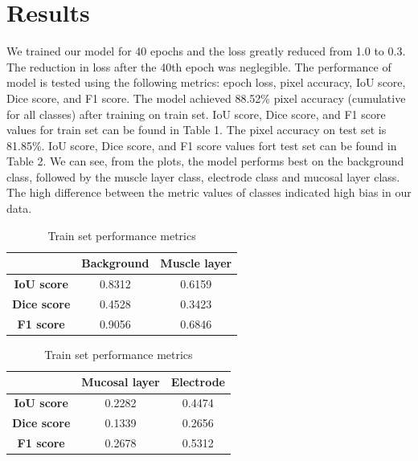 \section{Results}
\label{sec:results}

We trained our model for 40 epochs and the loss greatly reduced from 1.0 to 0.3. The reduction in loss after the 40th epoch was neglegible. The performance of model is tested using the following metrics: epoch loss, pixel accuracy, IoU score, Dice score, and F1 score. The model achieved 88.52\% pixel accuracy (cumulative for all classes) after training on train set. IoU score, Dice score, and F1 score values for train set can be found in Table 1. The pixel accuracy on test set is 81.85\%. IoU score, Dice score, and F1 score values fort test set can be found in Table 2. We can see, from the plots, the model performs best on the background class, followed by the muscle layer class, electrode class and mucosal layer class. The high difference between the metric values of classes indicated high bias in our data.

\begin{table}[htbp]
    \centering
    \caption{Train set performance metrics}
    \label{tab:train-metrics}

    \begin{tabular}{|c|c|c|}
        \hline
        & \textbf{Background} & \textbf{Muscle layer} \\
        \hline
        \textbf{IoU score} & 0.8312 & 0.6159 \\
        \textbf{Dice score} & 0.4528 & 0.3423 \\
        \textbf{F1 score} & 0.9056 & 0.6846 \\
        \hline
    \end{tabular}

    \begin{tabular}{|c|c|c|}
        \hline
        & \textbf{Mucosal layer} & \textbf{Electrode} \\
        \hline
        \textbf{IoU score} & 0.2282 & 0.4474 \\
        \textbf{Dice score} & 0.1339 & 0.2656 \\
        \textbf{F1 score} & 0.2678 & 0.5312 \\
        \hline
    \end{tabular}

\end{table}

